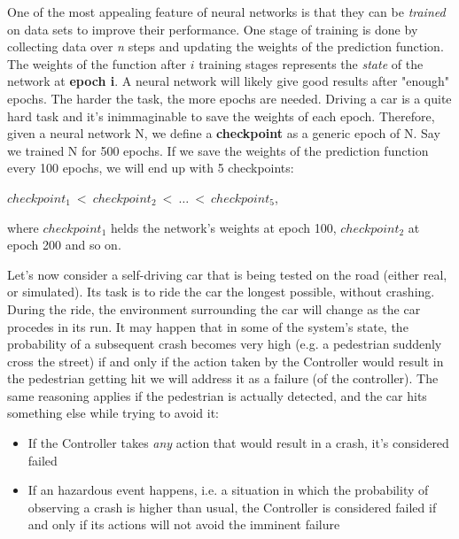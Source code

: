 One of the most appealing feature of neural networks is that they can be \textsl{trained} on data sets to improve their performance. One stage of training is done by collecting data over \textsl{n} steps and updating the weights of the prediction function. The weights of the function after $i$ training stages represents the \textsl{state} of the network at \textbf{epoch i}.\newline
A neural network will likely give good results after "enough" epochs. The harder the task, the more epochs are needed. Driving a car is a quite hard task and it's inimmaginable to save the weights of each epoch. Therefore, given a neural network N, we define a \textbf{checkpoint} as a generic epoch of N. Say we trained N for 500 epochs. If we save the weights of the prediction function every 100 epochs, we will end up with 5 checkpoints:

\begin{center}
	$checkpoint_{1}\: <\: checkpoint_{2}\: <\: \dots \:<\: checkpoint_{5}$,
\end{center}

where $checkpoint_{1}$ helds the network's weights at epoch 100, $checkpoint_{2}$ at epoch 200 and so on.\newline

Let's now consider a self-driving car that is being tested on the road (either real, or simulated). Its task is to ride the car the longest possible, without crashing. During the ride, the environment surrounding the car will change as the car procedes in its run. It may happen that in some of the system's state, the probability of a subsequent crash becomes very high (e.g. a pedestrian suddenly cross the street) if and only if the action taken by the Controller would result in the pedestrian getting hit we will address it as a failure (of the controller). The same reasoning applies if the pedestrian is actually detected, and the car hits something else while trying to avoid it:

\begin{itemize}
	\item If the Controller takes \textsl{any} action that would result in a crash, it's considered failed
	\item If an hazardous event happens, i.e. a situation in which the probability of observing a crash is higher than usual, the Controller is considered failed if and only if its actions will not avoid the imminent failure
\end{itemize}

